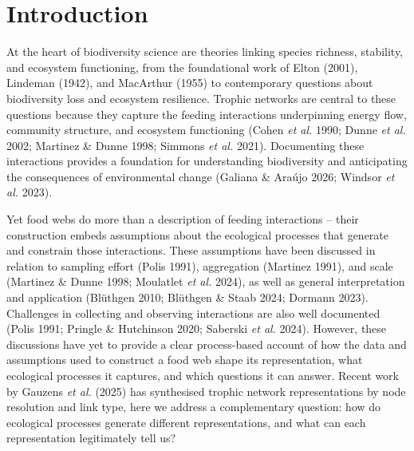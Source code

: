 \documentclass[
]{article}
\renewcommand*\contentsname{Table of contents}
\newcommand\contentsname{Table of contents}
\begin{document}
\linenumbers
\doublespacing %

\makeatletter
{}%
\makeatother
\renewcommand*\contentsname{Table of contents}
{
\setcounter{tocdepth}{3}
\tableofcontents
}

\section{Introduction}\label{introduction}

At the heart of biodiversity science are theories linking species
richness, stability, and ecosystem functioning, from the foundational
work of Elton (2001), Lindeman (1942), and MacArthur (1955) to
contemporary questions about biodiversity loss and ecosystem resilience.
Trophic networks are central to these questions because they capture the
feeding interactions underpinning energy flow, community structure, and
ecosystem functioning (Cohen \emph{et al.} 1990; Dunne \emph{et al.}
2002; Martinez \& Dunne 1998; Simmons \emph{et al.} 2021). Documenting
these interactions provides a foundation for understanding biodiversity
and anticipating the consequences of environmental change (Galiana \&
Araújo 2026; Windsor \emph{et al.} 2023).

Yet food webs do more than a description of feeding interactions --
their construction embeds assumptions about the ecological processes
that generate and constrain those interactions. These assumptions have
been discussed in relation to sampling effort (Polis 1991), aggregation
(Martinez 1991), and scale (Martinez \& Dunne 1998; Moulatlet \emph{et
al.} 2024), as well as general interpretation and application (Blüthgen
2010; Blüthgen \& Staab 2024; Dormann 2023). Challenges in collecting
and observing interactions are also well documented (Polis 1991; Pringle
\& Hutchinson 2020; Saberski \emph{et al.} 2024). However, these
discussions have yet to provide a clear process-based account of how the
data and assumptions used to construct a food web shape its
representation, what ecological processes it captures, and which
questions it can answer. Recent work by Gauzens \emph{et al.} (2025) has
synthesised trophic network representations by node resolution and link
type, here we address a complementary question: how do ecological
processes generate different representations, and what can each
representation legitimately tell us?
\end{document}
